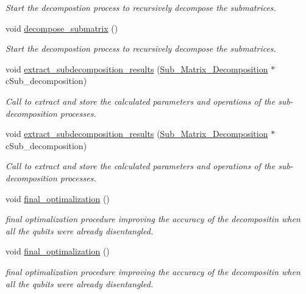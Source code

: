\begin{DoxyCompactItemize}
\begin{DoxyCompactList}\small\item\em Start the decompostion process to recursively decompose the submatrices. \end{DoxyCompactList}\item 
void \hyperlink{class_n___qubit___decomposition_a7d01c357e16448fc65f0a4fa77a1d66e}{decompose\+\_\+submatrix} ()
\begin{DoxyCompactList}\small\item\em Start the decompostion process to recursively decompose the submatrices. \end{DoxyCompactList}\item 
void \hyperlink{class_n___qubit___decomposition_a7d5519d19cc77f2d994e7f5674e233eb}{extract\+\_\+subdecomposition\+\_\+results} (\hyperlink{class_sub___matrix___decomposition}{Sub\+\_\+\+Matrix\+\_\+\+Decomposition} $\ast$c\+Sub\+\_\+decomposition)
\begin{DoxyCompactList}\small\item\em Call to extract and store the calculated parameters and operations of the sub-\/decomposition processes. \end{DoxyCompactList}\item 
void \hyperlink{class_n___qubit___decomposition_a7d5519d19cc77f2d994e7f5674e233eb}{extract\+\_\+subdecomposition\+\_\+results} (\hyperlink{class_sub___matrix___decomposition}{Sub\+\_\+\+Matrix\+\_\+\+Decomposition} $\ast$c\+Sub\+\_\+decomposition)
\begin{DoxyCompactList}\small\item\em Call to extract and store the calculated parameters and operations of the sub-\/decomposition processes. \end{DoxyCompactList}\item 
void \hyperlink{class_n___qubit___decomposition_a3a94b94920838968d4798096e969cd78}{final\+\_\+optimalization} ()
\begin{DoxyCompactList}\small\item\em final optimalization procedure improving the accuracy of the decompositin when all the qubits were already disentangled. \end{DoxyCompactList}\item 
void \hyperlink{class_n___qubit___decomposition_a3a94b94920838968d4798096e969cd78}{final\+\_\+optimalization} ()
\begin{DoxyCompactList}\small\item\em final optimalization procedure improving the accuracy of the decompositin when all the qubits were already disentangled. \end{DoxyCompactList}\item 

\end{DoxyCompactItemize}
